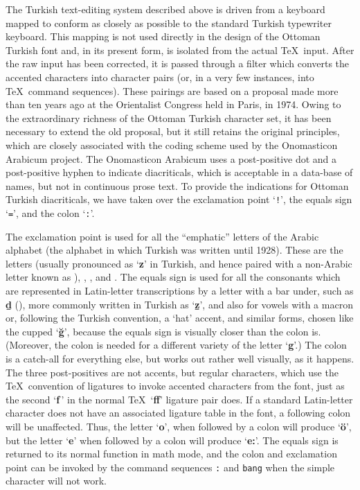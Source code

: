 \noindent
The Turkish text-editing system described above
is driven from a keyboard mapped to conform as
closely as possible to the standard Turkish typewriter keyboard.
This mapping is not used directly in the design of the Ottoman
Turkish font and, in its present form,
is isolated from the actual \TeX\ input.  After the
raw input has been corrected, it is passed through a filter which
converts the accented characters into character pairs (or, in a very
few instances, into \TeX\ command sequences).  These pairings are
based on a proposal made more than ten years ago at the Orientalist
Congress held in Paris, in 1974.  Owing to the extraordinary richness
of the Ottoman Turkish character set, it has been necessary to extend
the old proposal, but it still retains the original principles, which
are closely associated with the coding scheme used by the Onomasticon
Arabicum project.  The Onomasticon Arabicum uses a post-positive dot
and a post-positive hyphen to indicate diacriticals, which is
acceptable in a data-base of names, but not in continuous prose text.
To provide the indications for Ottoman Turkish diacriticals, 
we have taken over the exclamation
point `{\tt!}', the equals sign `{\tt=}', and the colon `{\tt:}'.

The exclamation point is used for all the ``emphatic'' letters of the
Arabic alphabet (the alphabet in which Turkish was written until
1928).  These are the letters  (usually pronounced as `{\bf z}' in
Turkish, and hence paired with a non-Arabic letter known as ), 
, ,  and .  
The equals sign is used for all the
consonants which are represented in Latin-letter transcriptions by a
letter with a bar under, such as {\bf\b d} (), more 
commonly written in
Turkish as `{\bf\b z}', and also for vowels with a macron or, following the
Turkish convention, a `hat' accent, and similar forms, chosen like the
cupped `{\bf\u g}', because the equals sign is visually closer than the colon
is.  (Moreover, the colon is needed for a different variety of the
letter `{\bf g}'.)  The colon is a catch-all for everything else, but works
out rather well visually, as it happens.  The three post-positives are
not accents, but regular characters, which use the \TeX\ convention of
ligatures to invoke accented characters from the font, just as the
second `{\bf f$\,$}' in the normal \TeX\ `{\bf ff}' 
ligature pair does.  If a standard
Latin-letter character does not have an associated ligature table in
the font, a following colon will be unaffected.  
Thus, the letter `{\bf o}',
when followed by a colon will produce `{\bf\"o}', but the letter `{\bf e}' when
followed by a colon will produce `{\bf e:}'.  The equals sign is returned to
its normal function in math mode, and the colon and exclamation point
can be invoked by the command sequences {\tt\bs:} and {\tt\bs bang}
when the simple character will not work.

